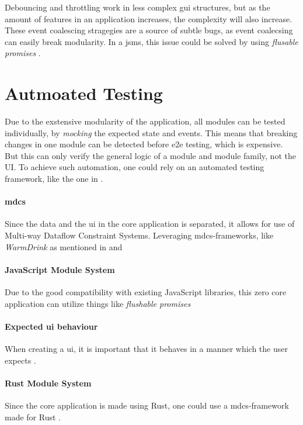 Debouncing and throttling work in less complex \gls{gui} structures, but as the
amount of features in an application increases, the complexity will also
increase. These event coalescing stragegies are a source of subtle bugs, as
event coalecsing can easily break modularity. In a \gls{jsms}, this issue could
be solved by using \textit{flusable promises} \cite{flush}.


\section{Autmoated Testing}
Due to the exstensive modularity of the application, all modules can be tested
individually, by \textit{mocking} the expected state and events. This means that
breaking changes in one module can be detected before \gls{e2e} testing, which
is expensive.  But this can only verify the general logic of a
module and module family, not the UI. To achieve such automation, one could rely
on an automated testing framework, like the one in \cite{autoUi}.

\paragraph{\gls{mdcs}} Since the data and the \gls{ui}
in the core application is separated, it allows for use of Multi-way Dataflow
Constraint Systems. Leveraging \gls{mdcs}-frameworks, like \textit{WarmDrink} as
mentioned in \cite{warmDrink} and \cite{dslMdcs}

\paragraph{JavaScript Module System} Due to the good compatibility with existing
JavaScript libraries, this zero core application can utilize things like
\textit{flushable promises} \cite{flush}

\paragraph{Expected \gls{ui} behaviour} When creating a \gls{ui}, it is
important that it behaves in a manner which the user expects \cite{leastGui}.

\paragraph{Rust Module System} Since the core application is made using Rust,
one could use a \gls{mdcs}-framework made for Rust \cite{mcdsRust}.

